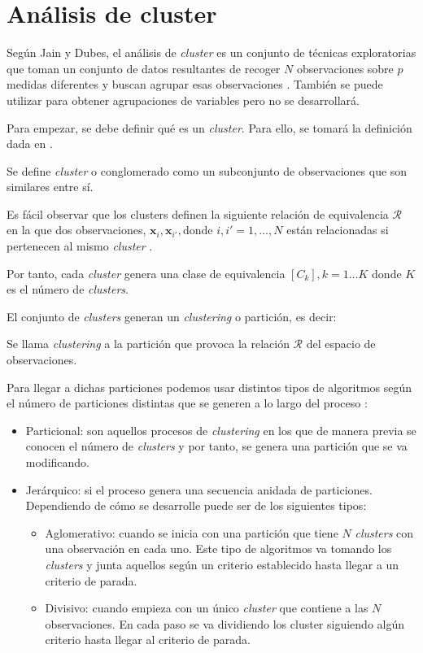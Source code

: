 \section{Análisis de cluster}

\noindent Según Jain y Dubes,  el análisis de \emph{cluster} es un conjunto de técnicas exploratorias que toman un conjunto de datos resultantes de recoger $N$ observaciones sobre $p$ medidas diferentes y buscan agrupar esas observaciones \cite{Jain 1988}. También se puede utilizar  para obtener agrupaciones de variables pero no se desarrollará.

\noindent Para empezar, se debe definir qué es un \emph{cluster}. Para ello, se tomará la definición dada en \cite{Everitt 2011}.

\begin{defi}
Se define \emph{cluster} o conglomerado como un subconjunto de observaciones que son similares entre sí. 
\end{defi}

\noindent Es fácil observar que los clusters definen la siguiente relación de equivalencia $\mathcal{R}$ en la que dos observaciones, $\mathbf{x}_i,\mathbf{x}_{i'}, \text{donde }i,i'=1,\ldots,N$ están relacionadas si pertenecen al mismo \emph{cluster} \cite{Cuadras 2014}.

\noindent Por tanto, cada \emph{cluster} genera una clase de equivalencia $[C_k], k=1\ldots K$ donde $K$ es el número de \emph{clusters}.

\noindent El conjunto de \emph{clusters} generan un \emph{clustering} o partición, es decir:
\begin{defi}
Se llama \textit{clustering} a la partición que provoca la relación $\mathcal{R}$ del espacio de observaciones. 
\end{defi}

\noindent Para llegar a dichas particiones podemos usar distintos tipos de algoritmos según el número de particiones distintas que se generen a lo largo del proceso \cite{Jain 1988}:
\begin{itemize}
\item Particional: son aquellos procesos de \emph{clustering} en los que de manera previa se conocen el número de \emph{clusters} y por tanto, se genera una partición que se va modificando.
\item Jerárquico: si el proceso genera una secuencia anidada de particiones. Dependiendo de cómo se desarrolle puede ser de los siguientes tipos:
\begin{itemize}
\item Aglomerativo: cuando se inicia con una partición que tiene $N$ \emph{clusters} con una observación en cada uno. Este tipo de algoritmos va tomando los \emph{clusters} y junta aquellos según un criterio establecido hasta llegar a un criterio de parada. 
\item Divisivo: cuando empieza con un único \emph{cluster} que contiene a las $N$ observaciones. En cada paso se va dividiendo los cluster siguiendo algún criterio hasta llegar al criterio de parada. 
\end{itemize}
\end{itemize}

